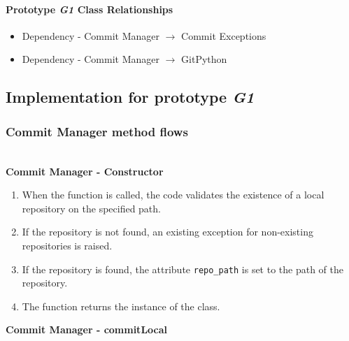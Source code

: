 \paragraph{Prototype \emph{G1} Class Relationships}

\begin{itemize}
    \item Dependency - Commit Manager $\rightarrow$ Commit Exceptions
    \item Dependency - Commit Manager $\rightarrow$ GitPython
\end{itemize}

\subsection{Implementation for prototype \emph{G1}}

\subsubsection{Commit Manager method flows} \mbox{}\\

\textbf{Commit Manager - Constructor}
\begin{enumerate}
    \item When the function is called, the code validates the existence of a local repository on the specified path.
    \item If the repository is not found, an existing exception for non-existing repositories is raised.
    \item If the repository is found, the attribute \texttt{repo\_path} is set to the path of the repository.
    \item The function returns the instance of the class.
\end{enumerate}

\textbf{Commit Manager - commitLocal}

